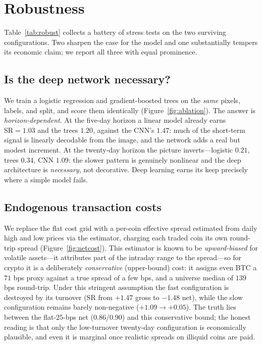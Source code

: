 \documentclass[11pt]{article}
\newcommand{\sharpe}{\ensuremath{\mathrm{SR}}}
\begin{document}
\section{Robustness}
\label{sec:robust}

Table~\ref{tab:robust} collects a battery of stress tests on the two surviving configurations. Two
sharpen the case for the model and one substantially tempers its economic claim; we report all three
with equal prominence.

\subsection{Is the deep network necessary?}
We train a logistic regression and gradient-boosted trees \citep{ke2017lightgbm} on the \emph{same}
pixels, labels, and split, and score them identically (Figure~\ref{fig:ablation}). The answer is
\emph{horizon-dependent}. At the five-day horizon a linear model already earns $\sharpe=1.03$ and the
trees $1.20$, against the CNN's $1.47$: much of the short-term signal is linearly decodable from the
image, and the network adds a real but modest increment. At the twenty-day horizon the picture
inverts---logistic $0.21$, trees $0.34$, CNN $\mathbf{1.09}$: the slower pattern is genuinely
nonlinear and the deep architecture is \emph{necessary}, not decorative. Deep learning earns its keep
precisely where a simple model fails.

\subsection{Endogenous transaction costs}
We replace the flat cost grid with a per-coin effective spread estimated from daily high and low
prices via the \citet{corwin2012simple} estimator, charging each traded coin its own round-trip
spread (Figure~\ref{fig:netcost}). This estimator is known to be \emph{upward-biased} for volatile
assets---it attributes part of the intraday range to the spread---so for crypto it is a deliberately
\emph{conservative} (upper-bound) cost: it assigns even BTC a $71$ bps proxy against a true spread of
a few bps, and a universe median of $139$ bps round-trip. Under this stringent assumption the fast
configuration is destroyed by its turnover ($\sharpe$ from $+1.47$ gross to $-1.48$ net), while the
slow configuration remains barely non-negative ($+1.09\to+0.05$). The truth lies between the
flat-$25$-bps net ($0.86$/$0.90$) and this conservative bound; the honest reading is that only the
low-turnover twenty-day configuration is economically plausible, and even it is marginal once
realistic spreads on illiquid coins are paid.
\end{document}
